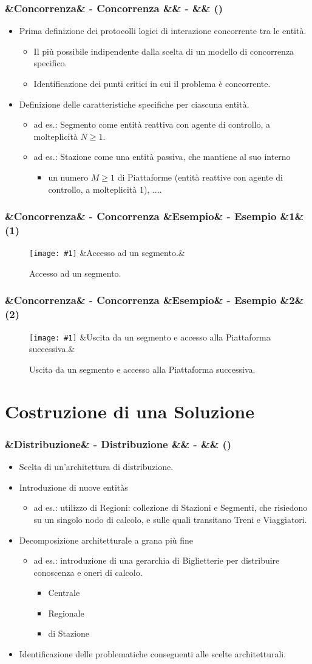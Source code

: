 \documentclass[slidestop,compress,blackandwhite]{beamer}
\newcommand{\newtitle}[4]{
	#1 
	\ifx&#2&%
	\else
  		\large- #2
	\fi
	\ifx&#3&%
	\else
  		\normalsize- #3
	\fi
	\ifx&#4&%
	\else
  		\normalsize (#4)
	\fi
}
\newcommand{\newframe}[5]{
	\begin{frame}
		\frametitle{\newtitle{#1}{#2}{#3}{#4}}
		#5
	\end{frame}
}
\newcommand{\myitemize}[1]{
	\begin{itemize}\itemsep4pt
	#1
	\end{itemize}
}
\newcommand{\newfigure}[3]{
	\begin{figure}
		\centering
		\texttt{[image: \#1]}
		\ifx&#3&%
		\else
	  		\caption{\scriptsize #3}
		\fi
	\end{figure}
}
\begin{document}

	
	\newframe{}{Concorrenza}{}{}{
		
		\myitemize {
			\item Prima definizione dei protocolli logici di interazione concorrente tra le entità.
				\myitemize {
					\item Il più possibile indipendente dalla scelta di un modello di concorrenza specifico.
					\item Identificazione dei punti critici in cui il problema è concorrente.
				}
			\item Definizione delle caratteristiche specifiche per ciascuna entità.
				\myitemize {
					\item ad es.: Segmento come entità reattiva con agente di controllo, a molteplicità $N\ge1$.
					\item ad es.: Stazione come una entità passiva, che mantiene al suo interno
						\myitemize {
							\item un numero $M\ge1$ di Piattaforme (entità reattive con agente di controllo, a molteplicità $1$),	....
						}
				}
				
		}
		
	}
	
	\newframe{}{Concorrenza}{Esempio}{1}{
		\newfigure{imgs/ingresso_segmento}{0.5}{Accesso ad un segmento.}
	}
	
	\newframe{}{Concorrenza}{Esempio}{2}{
		\newfigure{imgs/ingresso_stazione}{0.5}{Uscita da un segmento e accesso alla Piattaforma successiva.}
	}
	
	
	
\section{Costruzione di una Soluzione}\label{sol}

	\newframe{}{Distribuzione}{}{} {
		\myitemize {
			\item Scelta di un'architettura di distribuzione.
			\item Introduzione di nuove entitàs
				\myitemize {
					\item ad es.: utilizzo di Regioni: collezione di Stazioni e Segmenti, che risiedono su un singolo nodo di calcolo, e sulle quali transitano Treni e Viaggiatori.
				}
			\item Decomposizione architetturale a grana più fine
				\myitemize {
					\item ad es.: introduzione di una gerarchia di Biglietterie per distribuire conoscenza e oneri di calcolo.
						\myitemize {
							\item Centrale
							\item Regionale
							\item di Stazione
						}
				}
			\item Identificazione delle problematiche conseguenti alle scelte architetturali.
				
		}
	}
\end{document}
